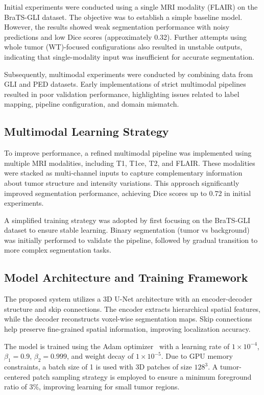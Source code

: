 \documentclass[conference]{IEEEtran}
\begin{document}
Initial experiments were conducted using a single MRI modality (FLAIR) on the BraTS-GLI dataset. The objective was to establish a simple baseline model. However, the results showed weak segmentation performance with noisy predictions and low Dice scores (approximately 0.32). Further attempts using whole tumor (WT)-focused configurations also resulted in unstable outputs, indicating that single-modality input was insufficient for accurate segmentation.

Subsequently, multimodal experiments were conducted by combining data from GLI and PED datasets. Early implementations of strict multimodal pipelines resulted in poor validation performance, highlighting issues related to label mapping, pipeline configuration, and domain mismatch.

\subsection{Multimodal Learning Strategy}

To improve performance, a refined multimodal pipeline was implemented using multiple MRI modalities, including T1, T1ce, T2, and FLAIR. These modalities were stacked as multi-channel inputs to capture complementary information about tumor structure and intensity variations. This approach significantly improved segmentation performance, achieving Dice scores up to 0.72 in initial experiments.

A simplified training strategy was adopted by first focusing on the BraTS-GLI dataset to ensure stable learning. Binary segmentation (tumor vs background) was initially performed to validate the pipeline, followed by gradual transition to more complex segmentation tasks.

\subsection{Model Architecture and Training Framework}

The proposed system utilizes a 3D U-Net architecture with an encoder-decoder structure and skip connections. The encoder extracts hierarchical spatial features, while the decoder reconstructs voxel-wise segmentation maps. Skip connections help preserve fine-grained spatial information, improving localization accuracy.

The model is trained using the Adam optimizer~\cite{14} with a learning rate of $1 \times 10^{-4}$, $\beta_1 = 0.9$, $\beta_2 = 0.999$, and weight decay of $1 \times 10^{-5}$. Due to GPU memory constraints, a batch size of 1 is used with 3D patches of size $128^3$. A tumor-centered patch sampling strategy is employed to ensure a minimum foreground ratio of 3\%, improving learning for small tumor regions.
\end{document}
